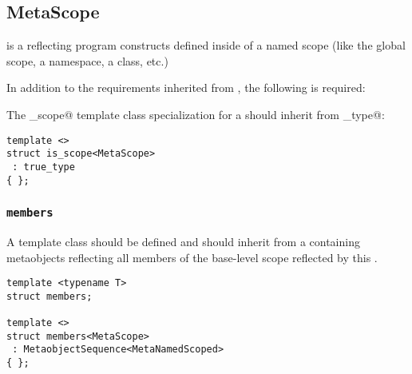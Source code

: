 \subsection{MetaScope}
\label{concept-MetaScope}


 is a  reflecting program constructs defined inside
of a named scope (like the global scope, a namespace, a class, etc.)

In addition to the requirements inherited from , the following is required:

The \verb@is_scope@ template class specialization for a  should
inherit from \verb@true_type@:

\begin{verbatim}
template <>
struct is_scope<MetaScope>
 : true_type
{ };
\end{verbatim}

\subsubsection{\texttt{members}}

A template class \verb@members@ should be defined and should inherit from a
 containing  metaobjects reflecting
all members of the base-level scope reflected by this .

\begin{verbatim}
template <typename T>
struct members;

template <>
struct members<MetaScope>
 : MetaobjectSequence<MetaNamedScoped>
{ };
\end{verbatim}

